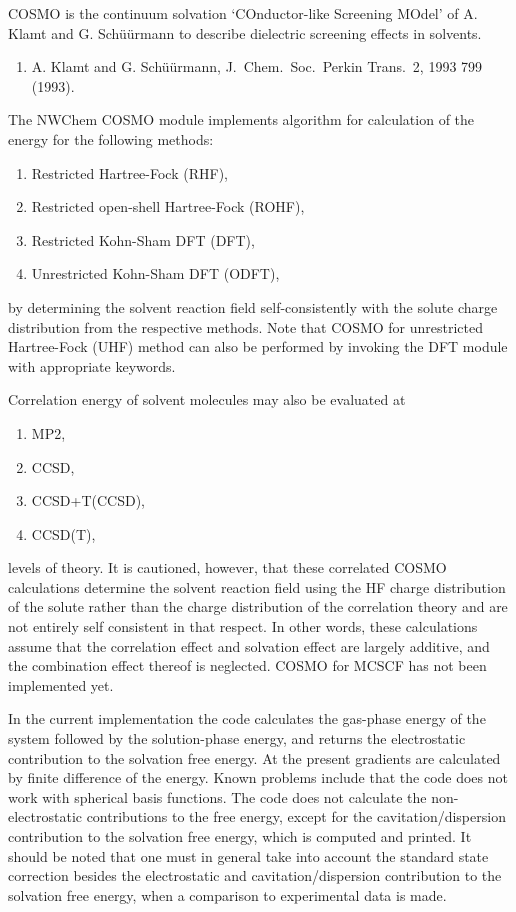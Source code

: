 \label{sec:cosmo}

COSMO is the continuum solvation `COnductor-like Screening MOdel'
of A. Klamt and G. Sch\"{u}\"{u}rmann to describe dielectric screening
effects in solvents.

\begin{enumerate}
\item A. Klamt and G. Sch\"{u}\"{u}rmann, J.~Chem.~Soc.~Perkin Trans.~2, 1993
799 (1993).
\end{enumerate}

The NWChem COSMO module implements algorithm for calculation of the
energy for the following methods:
\begin{enumerate}
\item Restricted Hartree-Fock (RHF),
\item Restricted open-shell Hartree-Fock (ROHF),
\item Restricted Kohn-Sham DFT (DFT),
\item Unrestricted Kohn-Sham DFT (ODFT),
\end{enumerate}
by determining the solvent reaction field self-consistently
with the solute charge distribution from the respective methods.
Note that COSMO for unrestricted Hartree-Fock (UHF) method
can also be performed by invoking the DFT module with appropriate
keywords.

Correlation energy of solvent molecules may also be evaluated at 
\begin{enumerate}
\item MP2,
\item CCSD,
\item CCSD+T(CCSD),
\item CCSD(T),
\end{enumerate}
levels of theory.  It is cautioned,
however, that these correlated COSMO calculations determine
the solvent reaction field using the HF charge distribution of
the solute rather than the charge distribution of the correlation
theory and are not entirely self consistent in that respect.  
In other words, these calculations assume that the correlation
effect and solvation effect are largely additive, and the combination
effect thereof is neglected. 
COSMO for MCSCF has not been implemented yet. 

In the current implementation the code
calculates the gas-phase energy of the system followed by the
solution-phase energy, and returns the electrostatic contribution
to the solvation free energy. 
At the present gradients are calculated by finite
difference of the energy.  Known problems include that the code does not 
work with spherical basis functions.
The code does not calculate the
non-electrostatic contributions to the free energy, except for
the cavitation/dispersion contribution to the solvation free energy,
which is computed and printed.
It should be noted that one must in general take into account 
the standard state correction besides the electrostatic
and cavitation/dispersion contribution to the solvation free energy,
when a comparison to experimental data is made.

